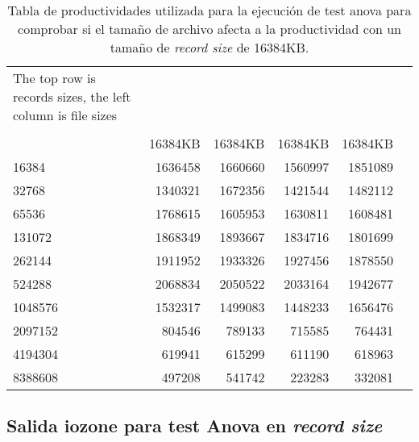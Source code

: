 \begin{table}[!htp]\centering
\caption{Tabla de productividades utilizada para la ejecución de test anova para comprobar si el tamaño de archivo afecta a la productividad con un tamaño de \textit{record size} de 16384KB.}
\scriptsize
\begin{tabular}{lrrrrr}\toprule
The top row is records sizes, the left column is file sizes & & & & \\
&\multicolumn{4}{c}{} \\
&16384KB &16384KB &16384KB &16384KB \\\midrule
16384 &1636458 &1660660 &1560997 &1851089 \\
32768 &1340321 &1672356 &1421544 &1482112 \\
65536 &1768615 &1605953 &1630811 &1608481 \\
131072 &1868349 &1893667 &1834716 &1801699 \\
262144 &1911952 &1933326 &1927456 &1878550 \\
524288 &2068834 &2050522 &2033164 &1942677 \\
1048576 &1532317 &1499083 &1448233 &1656476 \\
2097152 &804546 &789133 &715585 &764431 \\
4194304 &619941 &615299 &611190 &618963 \\
8388608 &497208 &541742 &223283 &332081 \\
\bottomrule
\end{tabular}
\end{table}

\subsection{Salida iozone para test Anova en \textit{record size}}

